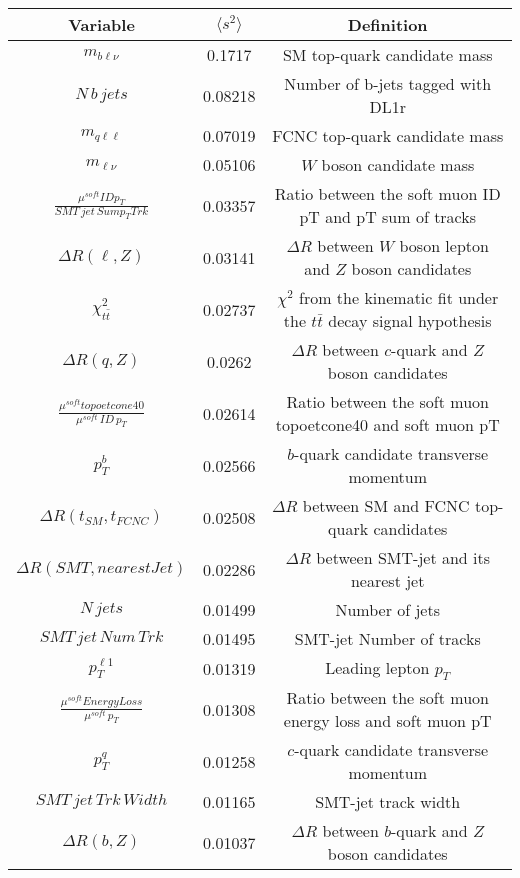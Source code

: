 %
\begin{tabular}{ccc}
\toprule
Variable & $\langle s^{2}\rangle$  & Definition \\
\midrule
$m_{b\ell\nu}$  &  0.1717  &  SM top-quark candidate mass  \\
$N\,b\,jets$  &  0.08218  &  Number of b-jets tagged with DL1r  \\
$m_{q\ell\ell}$  &  0.07019  &  FCNC top-quark candidate mass  \\
$m_{\ell\nu}$  &  0.05106  &  $W$ boson candidate mass  \\
$\frac{\mu^{soft} ID p_{T}}{SMT\,jet\,Sum p_{T} Trk}$  &  0.03357  &  Ratio between the soft muon ID pT and pT sum of tracks  \\
$\Delta R(\ell,Z)$  &  0.03141  &  $\Delta R$ between $W$ boson lepton and $Z$ boson candidates  \\
$\chi^2_{t\bar{t}}$  &  0.02737  &  $\chi^2$ from the kinematic fit under the $t\bar{t}$ decay signal hypothesis  \\
$\Delta R(q,Z)$  &  0.0262  &  $\Delta R$ between $c$-quark and $Z$ boson candidates  \\
$\frac{\mu^{soft} topoetcone40}{\mu^{soft}\,ID\,p_{T}}$  &  0.02614  &  Ratio between the soft muon topoetcone40 and soft muon pT  \\
$p_{T}^{b}$  &  0.02566  &  $b$-quark candidate transverse momentum  \\
$\Delta R(t_{SM},t_{FCNC})$  &  0.02508  &  $\Delta R$ between SM and FCNC top-quark candidates  \\
$\Delta R(SMT,nearestJet)$   &  0.02286  &  $\Delta R$ between SMT-jet and its nearest jet  \\
$N\,jets$  &  0.01499  &  Number of jets  \\
$SMT\,jet\,Num\,Trk$  &  0.01495  &  SMT-jet Number of tracks  \\
$p_{T}^{\ell1}$  &  0.01319  &  Leading lepton $p_{T}$  \\
$\frac{\mu^{soft} Energy Loss}{\mu^{soft}\,p_{T}} $  &  0.01308  &  Ratio between the soft muon energy loss and soft muon pT  \\
$p_{T}^{q}$  &  0.01258  &  $c$-quark candidate transverse momentum  \\
$SMT\,jet\,Trk\,Width$  &  0.01165  &  SMT-jet track width  \\
$\Delta R(b,Z)$  &  0.01037  &  $\Delta R$ between $b$-quark and $Z$ boson candidates  \\

\end{tabular}
